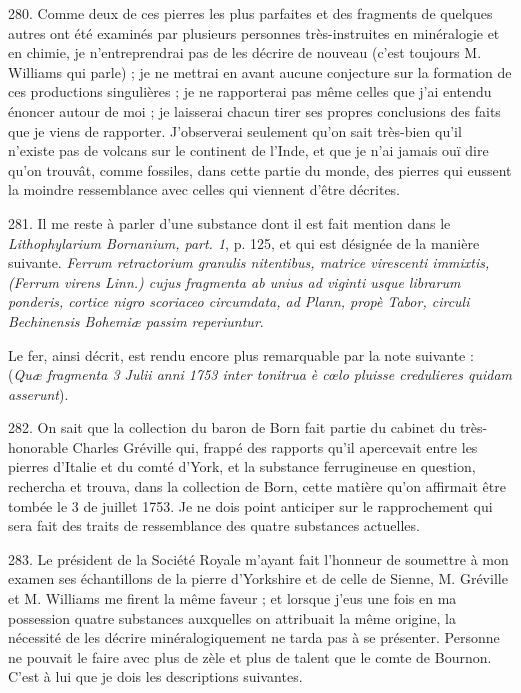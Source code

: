 \documentclass[a4paper, 11pt, oneside, polutonikogreek, french]{article}
\begin{document}
280. Comme deux de ces pierres les plus parfaites et des fragments de quelques autres ont été examinés par plusieurs personnes très-instruites en minéralogie et en chimie, je n'entreprendrai pas de les décrire de nouveau (c'est toujours M. Williams qui parle) ; je ne mettrai en avant aucune conjecture sur la formation de ces productions singulières ; je ne rapporterai pas même celles que j'ai entendu énoncer autour de moi ; je laisserai chacun tirer ses propres conclusions des faits que je viens de rapporter. J'observerai seulement qu'on sait très-bien qu'il n'existe pas de volcans sur le continent de l'Inde, et que je n'ai jamais ouï dire qu'on trouvât, comme fossiles, dans cette partie du monde, des pierres qui eussent la moindre ressemblance avec celles qui viennent d'être décrites.

281. Il me reste à parler d'une substance dont il est fait mention dans le \emph{Lithophylarium Bornanium, part. 1}, p. 125, et qui est désignée de la manière suivante. \og \emph{Ferrum retractorium granulis nitentibus, matrice virescenti immixtis, (Ferrum virens Linn.) cujus fragmenta ab unius ad viginti usque librarum ponderis, cortice nigro scoriaceo circumdata, ad Plann, propè Tabor, circuli Bechinensis Bohemiæ passim reperiuntur}. \fg

Le fer, ainsi décrit, est rendu encore plus remarquable par la note suivante : (\emph{Quæ fragmenta 3 Julii anni 1753 inter tonitrua è cœlo pluisse credulieres quidam asserunt}).

282. On sait que la collection du baron de Born fait partie du cabinet du très-honorable Charles Gréville qui, frappé des rapports qu'il apercevait entre les pierres d'Italie et du comté d'York, et la substance ferrugineuse en question, rechercha et trouva, dans la collection de Born, cette matière qu'on affirmait être tombée le 3 de juillet 1753. Je ne dois point anticiper sur le rapprochement qui sera fait des traits de ressemblance des quatre substances actuelles.

283. Le président de la Société Royale m'ayant fait l'honneur de soumettre à mon examen ses échantillons de la pierre d'Yorkshire et de celle de Sienne, M. Gréville et M. Williams me firent la même faveur ; et lorsque j'eus une fois en ma possession quatre substances auxquelles on attribuait la même origine, la nécessité de les décrire minéralogiquement ne tarda pas à se présenter. Personne ne pouvait le faire avec plus de zèle et plus de talent que le comte de Bournon. C'est à lui que je dois les descriptions suivantes.
\end{document}
